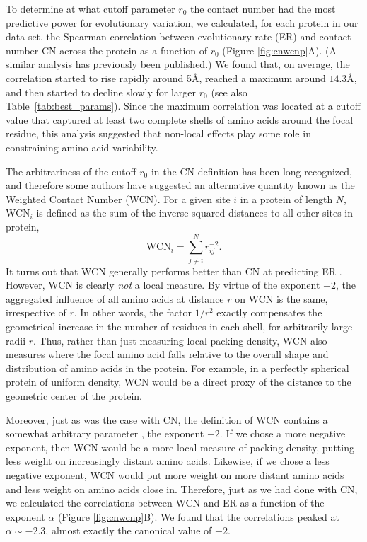 \documentclass[12pt]{article}
\begin{document}
To determine at what cutoff parameter $r_0$ the contact number had the most predictive power for evolutionary variation, we calculated, for each protein in our data set, the Spearman correlation between evolutionary rate (ER) and contact number CN across the protein as a function of $r_0$ (Figure \ref{fig:cnwcnp}A). (A similar analysis has previously been published\cite{yeh_local_2014}.) We found that, on average, the correlation started to rise rapidly around 5\AA, reached a maximum around $14.3$\AA, and then started to decline slowly for larger $r_0$ (see also Table~\ref{tab:best_params}). Since the maximum correlation was located at a cutoff value that captured at least two complete shells of amino acids around the focal residue, this analysis suggested that non-local effects play some role in constraining amino-acid variability. 

The arbitrariness of the cutoff $r_0$ in the CN definition has been long recognized, and therefore some authors \cite{lin_deriving_2008} have suggested an alternative quantity known as the Weighted Contact Number (WCN). For a given site $i$ in a protein of length $N$, WCN$_i$ is defined as the sum of the inverse-squared  distances to all other sites in protein,
    \begin{equation}
        \label{eqn:wcn_pwrl}
        \text{WCN}_{i} = \sum^N_{j\neq i} r_{ij}^{-2}.
    \end{equation}
It turns out that WCN generally performs better than CN at predicting ER \cite{yeh_site-specific_2014, yeh_local_2014, huang_mechanistic_2014}. However, WCN is clearly \emph{not} a local measure. By virtue of the exponent $-2$, the aggregated influence of all amino acids at distance $r$ on WCN is the same, irrespective of $r$. In other words, the factor $1/r^2$ exactly compensates the geometrical increase in the number of residues in each shell, for arbitrarily large radii $r$. Thus, rather than just measuring local packing density, WCN also measures where the focal amino acid falls relative to the overall shape and distribution of amino acids in the protein. For example, in a perfectly spherical protein of uniform density, WCN would be a direct proxy of the distance to the geometric center of the protein. 
    
Moreover, just as was the case with CN, the definition of WCN contains a somewhat arbitrary parameter \cite{yang_protein_2009}, the exponent $-2$. If we chose a more negative exponent, then WCN would be a more local measure of packing density, putting less weight on increasingly distant amino acids. Likewise, if we chose a less negative exponent, WCN would put more weight on more distant amino acids and less weight on amino acids close in. Therefore, just as we had done with CN, we  calculated the correlations between WCN and ER as a function of the exponent $\alpha$ (Figure \ref{fig:cnwcnp}B). We found that the correlations peaked at $\alpha\sim -2.3$, almost exactly the canonical value of $-2$.
\end{document}
